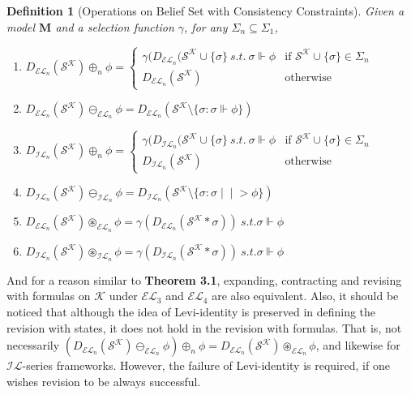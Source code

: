 \documentclass[12pt]{article}
\newtheorem{definition}{Definition}[section]
\newcommand{\ver}{\Vdash}
\newcommand{\inever}{\mid \! \mid \!\!>}
\newcommand{\K}{\mathcal{K}}
\newcommand{\SK}{\mathcal{S}^\mathcal{K}}
\newcommand{\ostar}{\circledast}
\begin{document}
\begin{definition}[Operations on Belief Set with Consistency Constraints]
    Given a model $\bm{M}$ and a selection function $\gamma$, for any $\Sigma_n \subseteq \Sigma_1$, 
    \begin{enumerate}
        \item[($\mathcal{EL}^\oplus$)] $D_{\mathcal{EL}_n} (\SK) \oplus_n \phi = \begin{cases}
        \gamma(D_{\mathcal{EL}_n}(\SK \cup \{\sigma\} \ s.t. \ \sigma \ver \phi & \text{if } \SK \cup \{\sigma\} \in \Sigma_n \\
        D_{\mathcal{EL}_n} (\SK) & \text{otherwise}
    \end{cases}$ 

        \item[($\mathcal{EL}^\ominus$)] $D_{\mathcal{EL}_n} (\SK) \ominus_{\mathcal{EL}_n} \phi = D_{\mathcal{EL}_n} (\SK \setminus \{\sigma: \sigma \ver \phi \})$ 
        
        \item[($\mathcal{IL}^\oplus$)] $D_{\mathcal{IL}_n} (\SK) \oplus_n \phi = \begin{cases}
        \gamma(D_{\mathcal{IL}_n}(\SK \cup \{\sigma\} \ s.t. \ \sigma \ver \phi & \text{if } \SK \cup \{\sigma\} \in \Sigma_n \\
        D_{\mathcal{IL}_n} (\SK) & \text{otherwise}
    \end{cases}$ 

        \item[($\mathcal{IL}^\ominus$)] $D_{\mathcal{IL}_n} (\SK) \ominus_{\mathcal{IL}_n} \phi = D_{\mathcal{IL}_n} (\SK \setminus \{\sigma: \sigma \inever \phi \})$ 
   
        \item[($\mathcal{EL}^\ostar$)] $D_{\mathcal{EL}_n} (\SK) \ostar_{\mathcal{EL}_n} \phi = \gamma (D_{\mathcal{EL}_n}(\SK * \sigma)) \ s.t. \sigma \ver \phi$        
        \item[($\mathcal{IL}^\ostar$)] $D_{\mathcal{IL}_n} (\SK) \ostar_{\mathcal{IL}_n} \phi = \gamma (D_{\mathcal{IL}_n}(\SK * \sigma)) \ s.t. \sigma \ver \phi$
    \end{enumerate}
\end{definition}
And for a reason similar to \textbf{Theorem 3.1}, expanding, contracting and revising with formulas on $\K$ under $\mathcal{EL}_3$ and $\mathcal{EL}_4$ are also equivalent. Also, it should be noticed that although the idea of Levi-identity is preserved in defining the revision with states, it does not hold in the revision with formulas. That is, not necessarily $(D_{\mathcal{EL}_n}(\SK) \ominus_{\mathcal{EL}_n} \phi) \oplus_n \phi = D_{\mathcal{EL}_n}(\SK) \ostar_{\mathcal{EL}_n} \phi$, and likewise for $\mathcal{IL}$-series frameworks. However, the failure of Levi-identity is required, if one wishes revision to be always successful. 
\end{document}
